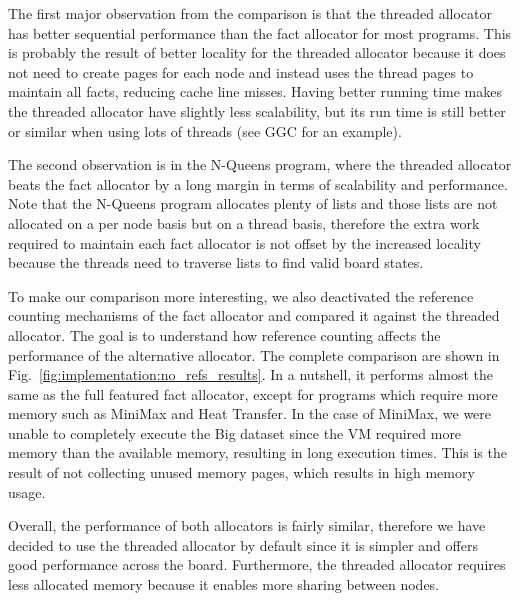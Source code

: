 The first major observation from the comparison is that the threaded allocator
has better sequential performance than the fact allocator for most programs.
This is probably the result of better locality for the threaded allocator
because it does not need to create pages for each node and instead uses the
thread pages to maintain all facts, reducing cache line misses.  Having better
running time makes the threaded allocator have slightly less scalability, but
its run time is still better or similar when using lots of threads (see GGC for
an example).

The second observation is in the N-Queens program, where the threaded allocator
beats the fact allocator by a long margin in terms of scalability and
performance. Note that the N-Queens program allocates plenty of lists and those
lists are not allocated on a per node basis but on a thread basis, therefore the
extra work required to maintain each fact allocator is not offset by the
increased locality because the threads need to traverse lists to find valid
board states.

To make our comparison more interesting, we also deactivated the reference
counting mechanisms of the fact allocator and compared it against the threaded
allocator. The goal is to understand how reference counting affects the
performance of the alternative allocator. The complete comparison are shown in
Fig.~\ref{fig:implementation:no_refs_results}. In a nutshell, it performs almost
the same as the full featured fact allocator, except for programs which require
more memory such as MiniMax and Heat Transfer. In the case of MiniMax, we were
unable to completely execute the Big dataset since the VM required more memory
than the available memory, resulting in long execution times. This is the result
of not collecting unused memory pages, which results in high memory usage.



Overall, the performance of both allocators is fairly similar, therefore we have
decided to use the threaded allocator by default since it is simpler and offers
good performance across the board. Furthermore, the threaded allocator requires
less allocated memory because it enables more sharing between nodes.


